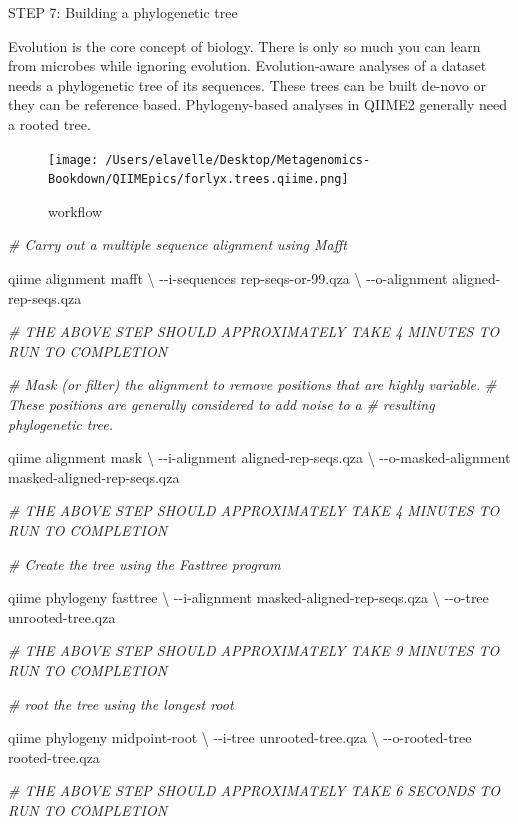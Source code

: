\documentclass[
]{book}
\newenvironment{Shaded}{\begin{snugshade}}{\end{snugshade}}
\newcommand{\CommentTok}[1]{\textcolor[rgb]{0.56,0.35,0.01}{\textit{#1}}}
\newcommand{\DataTypeTok}[1]{\textcolor[rgb]{0.13,0.29,0.53}{#1}}
\newcommand{\ExtensionTok}[1]{#1}
\newcommand{\NormalTok}[1]{#1}
\begin{document}
STEP 7: Building a phylogenetic tree

Evolution is the core concept of biology. There is only so much you can learn from microbes while ignoring evolution. Evolution-aware analyses of a dataset needs a phylogenetic tree of its sequences. These trees can be built de-novo or they can be reference based. Phylogeny-based analyses in QIIME2 generally need a rooted tree.

\begin{figure}
\centering
\texttt{[image: /Users/elavelle/Desktop/Metagenomics-Bookdown/QIIMEpics/forlyx.trees.qiime.png]}
\caption{workflow}
\end{figure}

\begin{Shaded}
\begin{Highlighting}[]

\CommentTok{\# Carry out a multiple sequence alignment using Mafft}

\ExtensionTok{qiime}\NormalTok{ alignment mafft }\DataTypeTok{\textbackslash{}}
\NormalTok{{-}{-}i{-}sequences rep{-}seqs{-}or{-}99.qza }\DataTypeTok{\textbackslash{}}
\NormalTok{{-}{-}o{-}alignment aligned{-}rep{-}seqs.qza}

\CommentTok{\# THE ABOVE STEP SHOULD APPROXIMATELY TAKE 4 MINUTES TO RUN TO COMPLETION}

\CommentTok{\# Mask (or filter) the alignment to remove positions that are highly variable. }
\CommentTok{\# These positions are generally considered to add noise to a}
\CommentTok{\# resulting phylogenetic tree.}

\ExtensionTok{qiime}\NormalTok{ alignment mask }\DataTypeTok{\textbackslash{}}
\NormalTok{{-}{-}i{-}alignment aligned{-}rep{-}seqs.qza }\DataTypeTok{\textbackslash{}}
\NormalTok{{-}{-}o{-}masked{-}alignment masked{-}aligned{-}rep{-}seqs.qza}

\CommentTok{\# THE ABOVE STEP SHOULD APPROXIMATELY TAKE 4 MINUTES TO RUN TO COMPLETION}

\CommentTok{\# Create the tree using the Fasttree program}

\ExtensionTok{qiime}\NormalTok{ phylogeny fasttree }\DataTypeTok{\textbackslash{}}
\NormalTok{{-}{-}i{-}alignment masked{-}aligned{-}rep{-}seqs.qza }\DataTypeTok{\textbackslash{}}
\NormalTok{{-}{-}o{-}tree unrooted{-}tree.qza}

\CommentTok{\# THE ABOVE STEP SHOULD APPROXIMATELY TAKE 9 MINUTES TO RUN TO COMPLETION}

\CommentTok{\# root the tree using the longest root}

\ExtensionTok{qiime}\NormalTok{ phylogeny midpoint{-}root }\DataTypeTok{\textbackslash{}}
\NormalTok{{-}{-}i{-}tree unrooted{-}tree.qza }\DataTypeTok{\textbackslash{}}
\NormalTok{{-}{-}o{-}rooted{-}tree rooted{-}tree.qza}

\CommentTok{\# THE ABOVE STEP SHOULD APPROXIMATELY TAKE 6 SECONDS TO RUN TO COMPLETION}
\end{Highlighting}
\end{Shaded}
\end{document}
